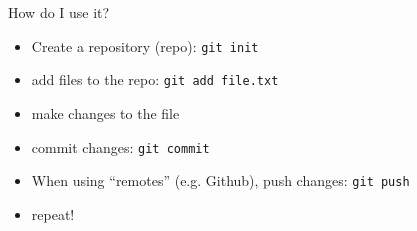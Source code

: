 \documentclass{beamer}
\begin{document}
\begin{frame}[fragile]{How do I use it?}
  \begin{itemize}
  \item Create a repository (repo): \verb|git init|
  \item add files to the repo: \verb|git add file.txt|
  \item make changes to the file
  \item commit changes: \verb|git commit|
  \item When using ``remotes'' (e.g. Github), push changes: \verb|git push|
  \item repeat!
  \end{itemize}

\end{frame}





\end{document}
